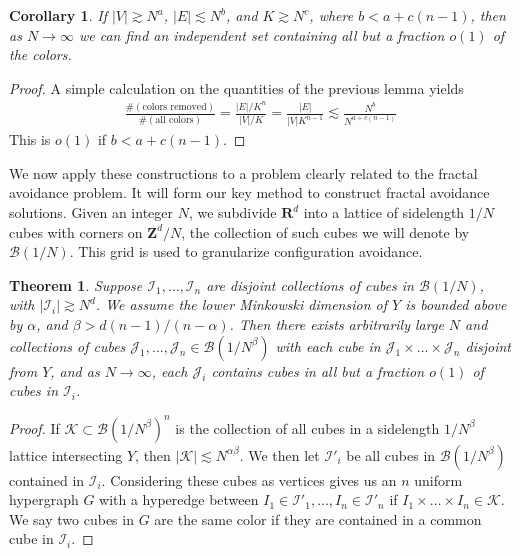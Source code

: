 \documentclass{article}
\theoremstyle{plain}
\newtheorem*{corollary}{Corollary}
\theoremstyle{plain}
\newtheorem{theorem}{Theorem}
\begin{document}
\begin{multicols}{2}
\begin{corollary}
	If $|V| \gtrsim N^a$, $|E| \lesssim N^b$, and $K \gtrsim N^c$, where $b < a + c(n-1)$, then as $N \to \infty$ we can find an independent set containing all but a fraction $o(1)$ of the colors.
\end{corollary}
\begin{proof}
	A simple calculation on the quantities of the previous lemma yields
	\begin{align*}
		\frac{\# ( \text{colors removed} )}{\# ( \text{all colors} )} = \frac{|E|/K^n}{|V|/K} = \frac{|E|}{|V|K^{n-1}} \lesssim \frac{N^b}{N^{a + c(n-1)}}
	\end{align*}
	This is $o(1)$ if $b < a + c(n-1)$.
\end{proof}

We now apply these constructions to a problem clearly related to the fractal avoidance problem. It will form our key method to construct fractal avoidance solutions. Given an integer $N$, we subdivide $\mathbf{R}^d$ into a lattice of sidelength $1/N$ cubes with corners on $\mathbf{Z}^d/N$, the collection of such cubes we will denote by $\mathcal{B}(1/N)$. This grid is used to granularize configuration avoidance.

\begin{theorem}
	Suppose $\mathcal{I}_1, \dots, \mathcal{I}_n$ are disjoint collections of cubes in $\mathcal{B}(1/N)$, with $|\mathcal{I}_i| \gtrsim N^d$. We assume the lower Minkowski dimension of $Y$ is bounded above by $\alpha$, and $\beta > d(n-1)/(n-\alpha)$. Then there exists arbitrarily large $N$ and collections of cubes $\mathcal{J}_1, \dots, \mathcal{J}_n \in \mathcal{B}(1/N^\beta)$ with each cube in $\mathcal{J}_1 \times \dots \times \mathcal{J}_n$ disjoint from $Y$, and as $N \to \infty$, each $\mathcal{J}_i$ contains cubes in all but a fraction $o(1)$ of cubes in $\mathcal{I}_i$.
\end{theorem}
\begin{proof}
	If $\mathcal{K} \subset \mathcal{B}(1/N^\beta)^n$ is the collection of all cubes in a sidelength $1/N^\beta$ lattice intersecting $Y$, then $|\mathcal{K}| \lesssim N^{\alpha \beta}$. We then let $\mathcal{I}'_i$ be all cubes in $\mathcal{B}(1/N^\beta)$ contained in $\mathcal{I}_i$. Considering these cubes as vertices gives us an $n$ uniform hypergraph $G$ with a hyperedge between $I_1 \in \mathcal{I}'_1, \dots, I_n \in \mathcal{I}'_n$ if $I_1 \times \dots \times I_n \in \mathcal{K}$. We say two cubes in $G$ are the same color if they are contained in a common cube in $\mathcal{I}_i$.


\end{proof}
\end{multicols}
\end{document}
